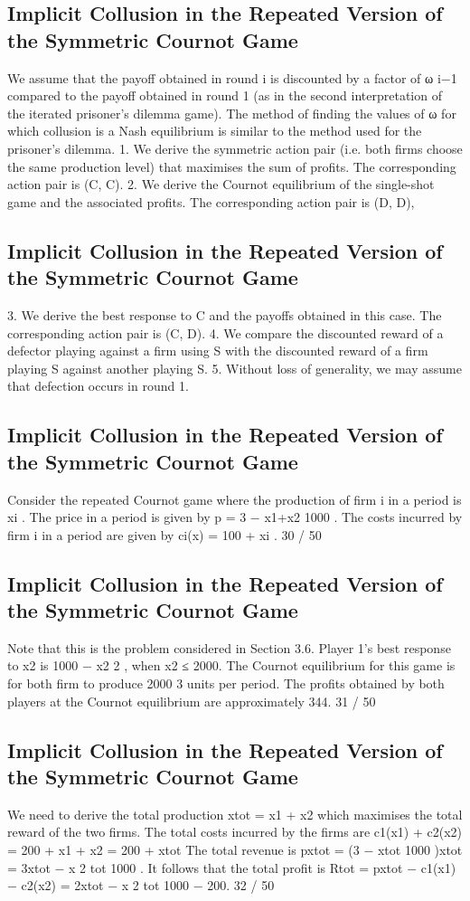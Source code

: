 \documentclass[]{report}
\begin{document}
\subsection{Implicit Collusion in the Repeated Version of the Symmetric Cournot Game}
We assume that the payoff obtained in round i is discounted by a
factor of ω
i−1
compared to the payoff obtained in round 1 (as in
the second interpretation of the iterated prisoner’s dilemma game).
The method of finding the values of ω for which collusion is a
Nash equilibrium is similar to the method used for the prisoner’s
dilemma.
1. We derive the symmetric action pair (i.e. both firms
choose the same production level) that maximises
the sum of profits. The corresponding action pair is
(C, C).
2. We derive the Cournot equilibrium of the single-shot
game and the associated profits. The corresponding
action pair is (D, D),
\subsection{Implicit Collusion in the Repeated Version of the Symmetric Cournot Game}
3. We derive the best response to C and the payoffs
obtained in this case. The corresponding action pair
is (C, D).
4. We compare the discounted reward of a defector
playing against a firm using S with the discounted
reward of a firm playing S against another playing S.
5. Without loss of generality, we may assume that
defection occurs in round 1.
\subsection{Implicit Collusion in the Repeated Version of the Symmetric Cournot Game}
Consider the repeated Cournot game where the production of firm
i in a period is xi
.
The price in a period is given by p = 3 −
x1+x2
1000 .
The costs incurred by firm i in a period are given by
ci(x) = 100 + xi
.
30 / 50
\subsection{Implicit Collusion in the Repeated Version of the Symmetric Cournot Game}
Note that this is the problem considered in Section 3.6.
Player 1’s best response to x2 is 1000 −
x2
2
, when x2 ≤ 2000.
The Cournot equilibrium for this game is for both firm to produce
2000
3
units per period.
The profits obtained by both players at the Cournot equilibrium are
approximately 344.
31 / 50
\subsection{Implicit Collusion in the Repeated Version of the Symmetric Cournot Game}
We need to derive the total production xtot = x1 + x2 which
maximises the total reward of the two firms.
The total costs incurred by the firms are
c1(x1) + c2(x2) = 200 + x1 + x2 = 200 + xtot
The total revenue is pxtot = (3 −
xtot
1000 )xtot = 3xtot −
x
2
tot
1000 .
It follows that the total profit is
Rtot = pxtot − c1(x1) − c2(x2) = 2xtot −
x
2
tot
1000 − 200.
32 / 50
\end{document}
